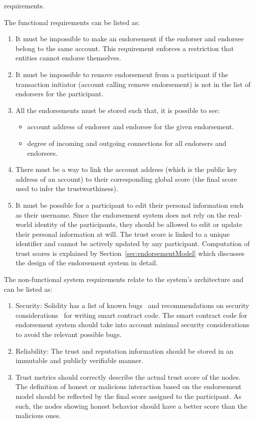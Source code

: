 requirements. \par
The functional requirements can be listed as: 
\begin{enumerate}
	\item It must be impossible to make an endorsement if the endorser and
		endorsee belong to the same account. \newline
		This requirement enforces a restriction that entities cannot endorse
		themselves.  
	\item It must be impossible to remove endorsement from a participant if the
		transaction initiator (account calling remove endorsement) is not in
		the list of endorsers for the participant.
	\item All the endorsements must be stored such that, it is possible to see: 
		\begin{itemize}
			\item account address of endorser and endorsee for the given
				endorsement. 
			\item degree of incoming and outgoing connections for all endorsers
				and endorsees.
		\end{itemize}
	\item There must be a way to link the account address (which is the public
		key address of an account) to their corresponding global score (the
		final score used to infer the trustworthiness).
	\item It must be possible for a participant to edit their personal
		information such as their username. Since the endorsement system does
		not rely on the real-world identity of the participants, they should be
		allowed to edit or update their personal information at will. The trust
		score is linked to a unique identifier and cannot be actively updated
		by any participant.  Computation of trust scores is explained by
		Section~\ref{sec:endorsementModel} which discusses the design of the
		endorsement system in detail. 
\end{enumerate}
The non-functional system requirements relate to the system's architecture and
can be listed as:
\begin{enumerate}
	\item Security: Solidity has a list of known bugs~\cite{soliditySecurity}
		and recommendations on security considerations~\cite{solidityBugs} for
		writing smart contract code. The smart contract code for endorsement
		system should take into account minimal security considerations to
		avoid the relevant possible bugs. 
	\item Reliability: The  trust and reputation information should be stored
		in an immutable and publicly verifiable manner.
	\item Trust metrics should correctly describe the actual trust score of the
		nodes. The definition of honest or malicious interaction based on the
		endorsement model should be reflected by the final score assigned to
		the participant. As such, the nodes showing honest behavior should have
		a better score than the malicious ones.   
\end{enumerate}

